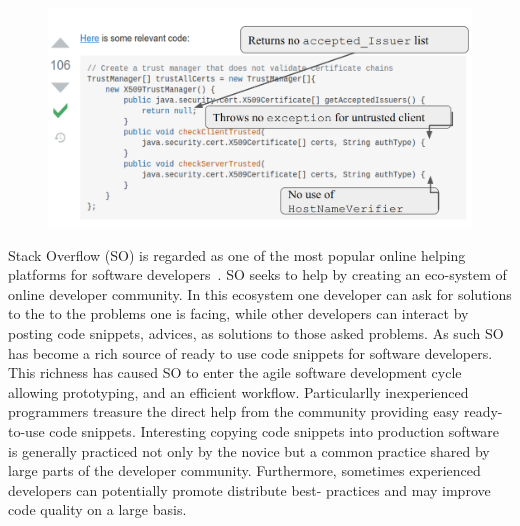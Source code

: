    \label{into}

   \begin{figure}
   \includegraphics[width=\linewidth]{Figures/SO_ss.png}
   \caption{}
   \label{fig:SO_screenshot}
   \end{figure}
   
   Stack Overflow (SO) is regarded as one of the most popular online helping platforms for software developers~\cite{8816778}. 
   SO seeks to help by creating an eco-system of online developer community. 
   In this ecosystem one developer can ask for solutions to the to the problems one is facing, while other developers can interact by posting code snippets, advices, as solutions to those asked problems. 
   As such SO has become a rich source of ready to use code snippets for software developers. 
   This richness has caused SO to enter the agile software development cycle allowing prototyping, and an efficient workflow. Particularlly inexperienced programmers treasure the direct help from the community providing easy ready-to-use code snippets.
   Interesting copying code snippets into production software is generally practiced not only by the novice but a common practice shared by large parts of the developer community. Furthermore, sometimes experienced developers can potentially promote distribute best- practices and may improve code quality on a large basis.

